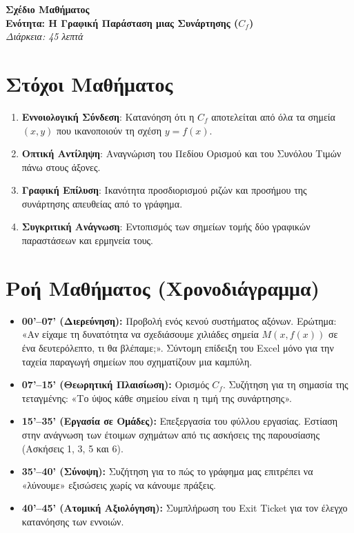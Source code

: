 \documentclass[a4paper, 12pt]{article}
\begin{document}
\begin{center}
  \LARGE \textbf{Σχέδιο Μαθήματος} \\
  \large \textbf{Ενότητα: Η Γραφική Παράσταση μιας Συνάρτησης ($C_f$)} \\
  \vspace{0.2cm}
  \small \textit{Διάρκεια: 45 λεπτά}
\end{center}

\section*{Στόχοι Μαθήματος}
\begin{enumerate}
  \item \textbf{Εννοιολογική Σύνδεση}: Κατανόηση ότι η $C_f$ αποτελείται από όλα τα σημεία $(x, y)$ που ικανοποιούν τη σχέση $y=f(x)$.
  \item \textbf{Οπτική Αντίληψη}: Αναγνώριση του Πεδίου Ορισμού και του Συνόλου Τιμών πάνω στους άξονες.
  \item \textbf{Γραφική Επίλυση}: Ικανότητα προσδιορισμού ριζών και προσήμου της συνάρτησης απευθείας από το γράφημα.
  \item \textbf{Συγκριτική Ανάγνωση}: Εντοπισμός των σημείων τομής δύο γραφικών παραστάσεων και ερμηνεία τους.
\end{enumerate}

\section*{Ροή Μαθήματος (Χρονοδιάγραμμα)}
\begin{itemize}[label=--]
  \item \textbf{00'--07' (Διερεύνηση):} Προβολή ενός κενού συστήματος αξόνων. Ερώτημα: «Αν είχαμε τη δυνατότητα να σχεδιάσουμε χιλιάδες σημεία $M(x, f(x))$ σε ένα δευτερόλεπτο, τι θα βλέπαμε;». Σύντομη επίδειξη του Excel μόνο για την ταχεία παραγωγή σημείων που σχηματίζουν μια καμπύλη.
  \item \textbf{07'--15' (Θεωρητική Πλαισίωση):} Ορισμός $C_f$. Συζήτηση για τη σημασία της τεταγμένης: «Το ύψος κάθε σημείου είναι η τιμή της συνάρτησης».
  \item \textbf{15'--35' (Εργασία σε Ομάδες):} Επεξεργασία του φύλλου εργασίας. Εστίαση στην ανάγνωση των έτοιμων σχημάτων από τις ασκήσεις της παρουσίασης (Ασκήσεις 1, 3, 5 και 6).
  \item \textbf{35'--40' (Σύνοψη):} Συζήτηση για το πώς το γράφημα μας επιτρέπει να «λύνουμε» εξισώσεις χωρίς να κάνουμε πράξεις.
  \item \textbf{40'--45' (Ατομική Αξιολόγηση):} Συμπλήρωση του Exit Ticket για τον έλεγχο κατανόησης των εννοιών.
\end{itemize}
\end{document}
